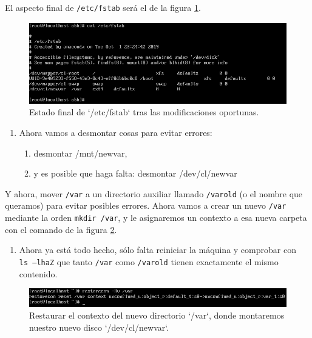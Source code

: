 \documentclass[
]{book}
\providecommand{\tightlist}{%
  \setlength{\itemsep}{0pt}\setlength{\parskip}{0pt}}
\begin{document}
El aspecto final de \texttt{/etc/fstab} será el de la figura \ref{fig:k}.

\begin{figure}

{\centering \includegraphics[width=0.95\linewidth]{images/k} 

}

\caption{Estado final de `/etc/fstab` tras las modificaciones oportunas.}\label{fig:k}
\end{figure}

\begin{enumerate}
\def\labelenumi{\arabic{enumi}.}
\setcounter{enumi}{12}
\tightlist
\item
  Ahora vamos a desmontar cosas para evitar errores:

  \begin{enumerate}
  \def\labelenumii{\roman{enumii}.}
  \tightlist
  \item
    desmontar /mnt/newvar,
  \item
    y es posible que haga falta: desmontar /dev/cl/newvar
  \end{enumerate}
\end{enumerate}

Y ahora, mover \texttt{/var} a un directorio auxiliar llamado \texttt{/varold} (o el nombre que queramos) para evitar posibles errores. Ahora vamos a crear un nuevo \texttt{/var} mediante la orden \texttt{mkdir\ /var}, y le asignaremos un contexto a esa nueva carpeta con el comando de la figura \ref{fig:l}.

\begin{enumerate}
\def\labelenumi{\arabic{enumi}.}
\setcounter{enumi}{13}
\tightlist
\item
  Ahora ya está todo hecho, sólo falta reiniciar la máquina y comprobar con \texttt{ls\ –lhaZ} que tanto \texttt{/var} como \texttt{/varold} tienen exactamente el mismo contenido.
\end{enumerate}

\begin{figure}

{\centering \includegraphics[width=0.95\linewidth]{images/l} 

}

\caption{Restaurar el contexto del nuevo directorio `/var`, donde montaremos nuestro nuevo disco `/dev/cl/newvar`.}\label{fig:l}
\end{figure}
\end{document}

